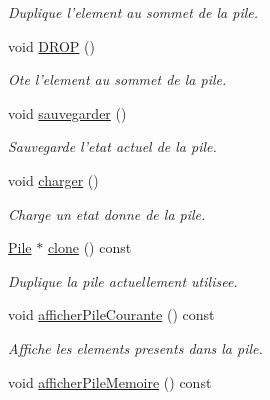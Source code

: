 \begin{DoxyCompactItemize}
\begin{DoxyCompactList}\small\item\em \-Duplique l'element au sommet de la pile. \end{DoxyCompactList}\item 
\hypertarget{class_l_o21_1_1_pile_a3a66cfb9e89b7b8ec0e6b75958183633}{void \hyperlink{class_l_o21_1_1_pile_a3a66cfb9e89b7b8ec0e6b75958183633}{\-D\-R\-O\-P} ()}\label{class_l_o21_1_1_pile_a3a66cfb9e89b7b8ec0e6b75958183633}

\begin{DoxyCompactList}\small\item\em \-Ote l'element au sommet de la pile. \end{DoxyCompactList}\item 
\hypertarget{class_l_o21_1_1_pile_a6eeceaf747f06fcb798e19e4fbb9b5ea}{void \hyperlink{class_l_o21_1_1_pile_a6eeceaf747f06fcb798e19e4fbb9b5ea}{sauvegarder} ()}\label{class_l_o21_1_1_pile_a6eeceaf747f06fcb798e19e4fbb9b5ea}

\begin{DoxyCompactList}\small\item\em \-Sauvegarde l'etat actuel de la pile. \end{DoxyCompactList}\item 
\hypertarget{class_l_o21_1_1_pile_aaf626065c4b7e5ef54b1a7663111f882}{void \hyperlink{class_l_o21_1_1_pile_aaf626065c4b7e5ef54b1a7663111f882}{charger} ()}\label{class_l_o21_1_1_pile_aaf626065c4b7e5ef54b1a7663111f882}

\begin{DoxyCompactList}\small\item\em \-Charge un etat donne de la pile. \end{DoxyCompactList}\item 
\hyperlink{class_l_o21_1_1_pile}{\-Pile} $\ast$ \hyperlink{class_l_o21_1_1_pile_a6acd2bf5bc8ea9cff26b8a301d12bc00}{clone} () const 
\begin{DoxyCompactList}\small\item\em \-Duplique la pile actuellement utilisee. \end{DoxyCompactList}\item 
\hypertarget{class_l_o21_1_1_pile_ab419ee4250785f1a19572ab5815915cf}{void \hyperlink{class_l_o21_1_1_pile_ab419ee4250785f1a19572ab5815915cf}{afficher\-Pile\-Courante} () const }\label{class_l_o21_1_1_pile_ab419ee4250785f1a19572ab5815915cf}

\begin{DoxyCompactList}\small\item\em \-Affiche les elements presents dans la pile. \end{DoxyCompactList}\item 
\hypertarget{class_l_o21_1_1_pile_a3dbaa1a110fa80d14339df8aed0d9eac}{void \hyperlink{class_l_o21_1_1_pile_a3dbaa1a110fa80d14339df8aed0d9eac}{afficher\-Pile\-Memoire} () const }\label{class_l_o21_1_1_pile_a3dbaa1a110fa80d14339df8aed0d9eac}


\end{DoxyCompactItemize}
